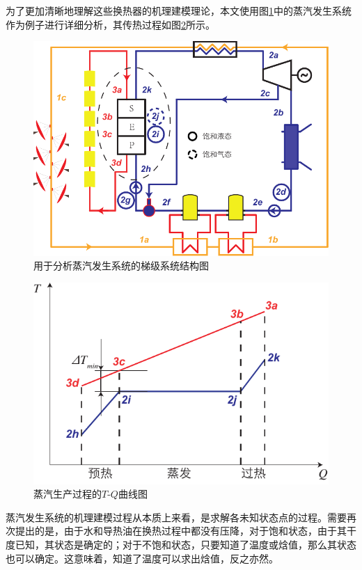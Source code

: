 为了更加清晰地理解这些换热器的机理建模理论，本文使用图\ref{fig:PES}中的蒸汽发生系统作为例子进行详细分析，其传热过程如图\ref{fig:PES_TQ}所示。


\noindent \begin{figure}[!ht]
\begin{center}
	\includegraphics[width = 0.8\columnwidth]{fig/PES}
	\caption{用于分析蒸汽发生系统的梯级系统结构图}
	\label{fig:PES}
\end{center}
\end{figure}

\noindent \begin{figure}[htbp]
\begin{center}
	\includegraphics[width = 0.5\columnwidth]{fig/PES_TQ}
	\caption{蒸汽生产过程的$T$-$Q$曲线图}
	\label{fig:PES_TQ}
\end{center}
\end{figure}

蒸汽发生系统的机理建模过程从本质上来看，是求解各未知状态点的过程。需要再次提出的是，由于水和导热油在换热过程中都没有压降，对于饱和状态，由于其干度已知，其状态是确定的；对于不饱和状态，只要知道了温度或焓值，那么其状态也可以确定。这意味着，知道了温度可以求出焓值，反之亦然。

